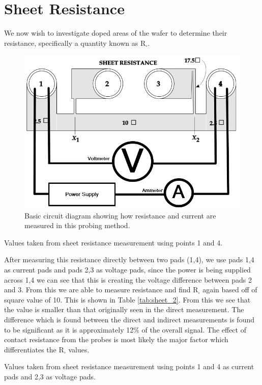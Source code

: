 \clearpage

\section{Sheet Resistance}

We now wish to investigate doped areas of the wafer to determine their resistance, specifically a quantity known as 
R$_\square$.

\begin{figure}[H]
    \centering
    \includegraphics[width=.6\textwidth]{figures/circuit_diagram.png}
    \caption{Basic circuit diagram showing how resistance and current are measured in this probing method.}
    \label{fig:circuit}
\end{figure}

\begin{table}[H]
    \centering
    
    \caption{Values taken from sheet resistance measurement using points 1 and 4.}
    \label{tab:sheet_1}
\end{table}

After measuring this resistance directly between two pads (1,4), we use pads 1,4 as current pads and pads 2,3 as voltage pads, since the power is being supplied across 1,4 we can see that this is creating the voltage difference between pads 2 and 3. From this we are able to measure resistance and find R$_\square$ again based off of square value of 10. This is shown in Table \ref{tab:sheet_2}. From this we see that the value is smaller than that originally seen in the direct measurement. The difference which is found between the direct and indirect measurements is found to be significant as it is approximately 12\% of the overall signal. The effect of contact resistance from the probes is most likely the major factor which differentiates the R$_\square$ values.

\begin{table}[H]
    \centering
    
    \caption{Values taken from sheet resistance measurement using points 1 and 4 as current pads and 2,3 as voltage pads.}
    \label{tab:sheet_2}
\end{table}


